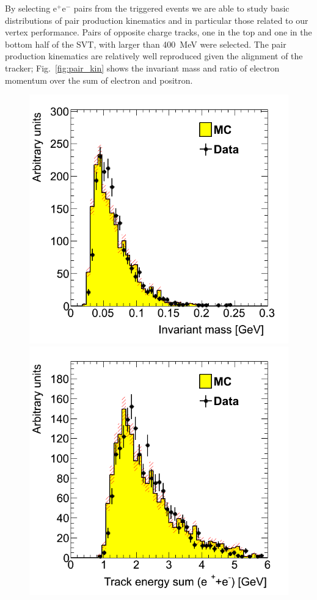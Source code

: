 By selecting e$^{+}$e$^{-}$ pairs from the triggered events we are able to study basic distributions of pair production kinematics and in particular those related to our vertex performance. Pairs of opposite charge tracks, one in the top and one in the bottom half of the SVT, with larger than 400~MeV were selected. The pair production kinematics are relatively well reproduced given the alignment of the tracker; Fig.~\ref{fig:pair_kin} shows the invariant mass and ratio of electron momentum over the sum of electron and positron. 
\begin{figure}[ht]
   \includegraphics[scale=0.25]{test2012/vertexing/figures/h_invM_h_invM_dataMC_trigseltwotrksel4hit_recoilmc_twotrkfilt.png}
   \includegraphics[scale=0.25]{test2012/vertexing/figures/h_sumE_h_sumE_dataMC_trigseltwotrksel4hit_recoilmc_twotrkfilt.png}

\end{figure}
